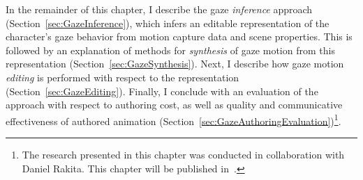 In the remainder of this chapter, I describe the gaze \textit{inference} approach (Section~\ref{sec:GazeInference}), which infers an editable representation of the character's gaze behavior from motion capture data and scene properties. This is followed by an explanation of methods for \emph{synthesis} of gaze motion from this representation (Section~\ref{sec:GazeSynthesis}). Next, I describe how gaze motion \emph{editing} is performed with respect to the representation (Section~\ref{sec:GazeEditing}). Finally, I conclude with an evaluation of the approach with respect to authoring cost, as well as quality and communicative effectiveness of authored animation (Section~\ref{sec:GazeAuthoringEvaluation})\footnote{The research presented in this chapter was conducted in collaboration with Daniel Rakita. This chapter will be published in~\citet{pejsa2016authoring}.}. 
